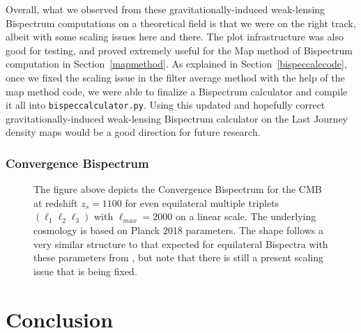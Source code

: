 \documentclass[11pt]{article}
\renewcommand{\_}[1]{\underline{ #1 }}
\newcommand{\us}{\textunderscore}
\begin{document}
{Overall, what we observed from these gravitationally-induced weak-lensing Bispectrum computations on a theoretical field is that we were on the right track, albeit with some scaling issues here and there. The plot infrastructure was also good for testing, and proved extremely useful for the Map method of Bispectrum computation in Section~\ref{mapmethod}. As explained in Section~\ref{bispeccalccode}, once we fixed the scaling issue in the filter average method with the help of the map method code, we were able to finalize a Bispectrum calculator and compile it all into \texttt{bispec\us calculator.py}. Using this updated and hopefully correct gravitationally-induced weak-lensing Bispectrum calculator on the Last Journey density maps would be a good direction for future research.

\subsubsection{Convergence Bispectrum}\label{conv_bispec_plots}

\begin{figure}[H]
    \centering
    \caption{The figure above depicts the Convergence Bispectrum for the CMB at redshift $z_s = 1100$ for even equilateral multiple triplets $(\ell_1 \ell_2 \ell_3)$ with $\ell_{max} = 2000$ on a linear scale. The underlying cosmology is based on Planck 2018 parameters. The shape follows a very similar structure to that expected for equilateral Bispectra with these parameters from \cite{Namikawa_2019}, but note that there is still a present scaling issue that is being fixed.}\label{fig:conv_bispec_plot}
\end{figure}

\section{Conclusion}

}
\end{document}
